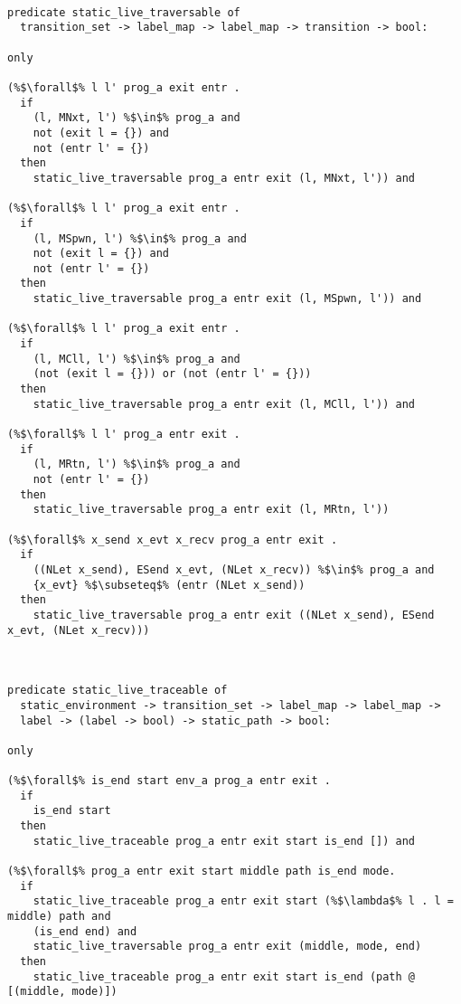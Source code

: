 \documentclass{article}
\begin{document}
\begin{lstlisting}[language=logic, style=codestyle1, escapechar=\%]

predicate static_live_traversable of
  transition_set -> label_map -> label_map -> transition -> bool:

only

(%$\forall$% l l' prog_a exit entr . 
  if
    (l, MNxt, l') %$\in$% prog_a and
    not (exit l = {}) and
    not (entr l' = {})
  then
    static_live_traversable prog_a entr exit (l, MNxt, l')) and

(%$\forall$% l l' prog_a exit entr .
  if
    (l, MSpwn, l') %$\in$% prog_a and 
    not (exit l = {}) and
    not (entr l' = {})
  then
    static_live_traversable prog_a entr exit (l, MSpwn, l')) and

(%$\forall$% l l' prog_a exit entr .
  if
    (l, MCll, l') %$\in$% prog_a and
    (not (exit l = {})) or (not (entr l' = {}))
  then
    static_live_traversable prog_a entr exit (l, MCll, l')) and

(%$\forall$% l l' prog_a entr exit .
  if
    (l, MRtn, l') %$\in$% prog_a and
    not (entr l' = {})
  then
    static_live_traversable prog_a entr exit (l, MRtn, l'))

(%$\forall$% x_send x_evt x_recv prog_a entr exit .
  if
    ((NLet x_send), ESend x_evt, (NLet x_recv)) %$\in$% prog_a and 
    {x_evt} %$\subseteq$% (entr (NLet x_send))
  then
    static_live_traversable prog_a entr exit ((NLet x_send), ESend x_evt, (NLet x_recv)))



predicate static_live_traceable of
  static_environment -> transition_set -> label_map -> label_map ->
  label -> (label -> bool) -> static_path -> bool:

only

(%$\forall$% is_end start env_a prog_a entr exit .
  if
    is_end start
  then
    static_live_traceable prog_a entr exit start is_end []) and

(%$\forall$% prog_a entr exit start middle path is_end mode. 
  if
    static_live_traceable prog_a entr exit start (%$\lambda$% l . l = middle) path and 
    (is_end end) and
    static_live_traversable prog_a entr exit (middle, mode, end) 
  then
    static_live_traceable prog_a entr exit start is_end (path @ [(middle, mode)])

  \end{lstlisting}
\end{document}
